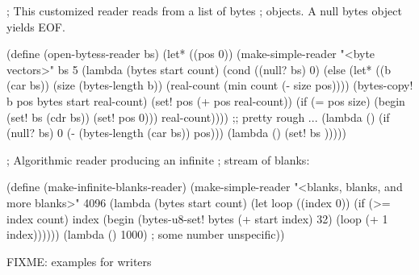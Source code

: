 \begin{schemenoindent}
; This customized reader reads from a list of bytes
; objects. A null bytes object yields EOF.

(define (open-bytess-reader bs)
  (let* ((pos 0))
    (make-simple-reader
     "<byte vectors>"
     bs
     5
     (lambda (bytes start count)
       (cond
        ((null? bs)
         0)
        (else
         (let* ((b (car bs))
                (size (bytes-length b))
                (real-count (min count (- size pos))))
           (bytes-copy! b pos
                           bytes start
                           real-count)
           (set! pos (+ pos real-count))
           (if (= pos size)
               (begin
                 (set! bs (cdr bs))
                 (set! pos 0)))
           real-count))))
     ;; pretty rough ...
     (lambda ()
       (if (null? bs)
           0
           (- (bytes-length (car bs)) pos)))
     \schfalse{} \schfalse{} \schfalse{}
     (lambda ()
       (set! bs \schfalse{})))))

; Algorithmic reader producing an infinite
; stream of blanks:

(define (make-infinite-blanks-reader)
  (make-simple-reader
    "<blanks, blanks, and more blanks>"
    \schfalse{}
    4096
    (lambda (bytes start count)
      (let loop ((index 0))
        (if (>= index count)
            index
            (begin
              (bytes-u8-set! bytes (+ start index) 32)
              (loop (+ 1 index))))))
    (lambda ()
      1000) ; some number
    \schfalse{} \schfalse{} \schfalse{}
    unspecific))

FIXME: examples for writers
\end{schemenoindent}
                    
